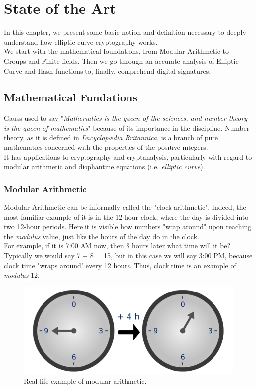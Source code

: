 \chapter{State of the Art}
\label{capitolo2}


In this chapter, we present some basic notion and definition necessary to deeply understand how elliptic curve cryptography works.\\
We start with the mathematical foundations, from Modular Arithmetic to Groups and Finite fields. Then we go through an accurate analysis of Elliptic Curve and Hash functions to, finally, comprehend digital signatures.

\section{Mathematical Fundations}
Gauss used to say "\textit{Mathematics is the queen of the sciences, and number theory is the queen of mathematics}" because of its importance in the discipline. Number theory, as it is defined in \textit{Encyclop\ae dia Britannica\cite{EnBrit}}, is a branch of pure mathematics concerned with the properties of the positive integers. \\
It has applications to cryptography and cryptanalysis, particularly with regard to modular arithmetic and diophantine equations (i.e. \textit{elliptic curve}).
\subsection{Modular Arithmetic}
Modular Arithmetic can be informally called the "clock arithmetic". Indeed, the most familiar example of it is in the 12-hour clock, where the day is divided into two 12-hour periods. Here it is visible how numbers "wrap around" upon reaching the \textit{modulus} value, just like the hours of the day do in the clock.\\
For example, if it is 7:00 AM now, then 8 hours later what time will it be? Typically we would say 7 + 8 = 15, but in this case we will say 3:00 PM, because clock time "wraps around" every 12 hours. Thus, clock time is an example of \textit{modulus} 12.
\begin{figure}[H]
	\centering
	\includegraphics[width=.75\textwidth]{clock.png}
	\caption{Real-life example of modular arithmetic\cite{wiki}.}
	\label{img:clock}
\end{figure}

